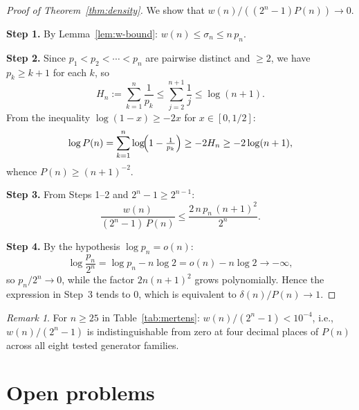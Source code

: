 \documentclass[11pt,a4paper]{amsart}
\theoremstyle{plain}
\theoremstyle{definition}
\theoremstyle{remark}
\newtheorem{remark}[theorem]{Remark}
\begin{document}
\begin{proof}[Proof of Theorem~\ref{thm:density}]
We show that $w(n)/((2^n-1) P(n)) \to 0$.

\textbf{Step 1.}
By Lemma~\ref{lem:w-bound}: $w(n) \leq \sigma_n \leq n\,p_n$.

\textbf{Step 2.}
Since $p_1 < p_2 < \cdots < p_n$ are pairwise distinct and $\geq 2$,
we have $p_k \geq k+1$ for each $k$, so
\[
  H_n := \sum_{k=1}^n \frac{1}{p_k} \leq \sum_{j=2}^{n+1} \frac{1}{j} \leq \log(n+1).
\]
From the inequality $\log(1-x) \geq -2x$ for $x \in [0, 1/2]$:
\[
  \log P(n) = \sum_{k=1}^n \log\!\Bigl(1 - \tfrac{1}{p_k}\Bigr)
  \geq -2H_n \geq -2\log(n+1),
\]
whence $P(n) \geq (n+1)^{-2}$.

\textbf{Step 3.}
From Steps 1--2 and $2^n - 1 \geq 2^{n-1}$:
\[
  \frac{w(n)}{(2^n-1)\,P(n)} \leq \frac{2\,n\,p_n\,(n+1)^2}{2^n}.
\]

\textbf{Step 4.}
By the hypothesis $\log p_n = o(n)$:
\[
  \log\frac{p_n}{2^n} = \log p_n - n\log 2 = o(n) - n\log 2 \to -\infty,
\]
so $p_n / 2^n \to 0$, while the factor $2n(n+1)^2$ grows polynomially.
Hence the expression in Step~3 tends to $0$,
which is equivalent to $\delta(n)/P(n) \to 1$.
\end{proof}

\begin{remark}
\label{rem:density-empirical}
For $n \geq 25$ in Table~\ref{tab:mertens}:
$w(n)/(2^n-1) < 10^{-4}$, i.e., $w(n)/(2^n-1)$ is
indistinguishable from zero at four decimal places of $P(n)$
across all eight tested generator families.
\end{remark}

\section{Open problems}
\label{sec:open}
\end{document}
